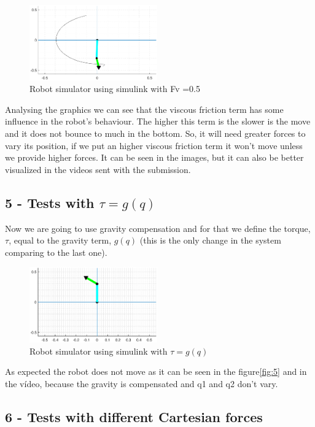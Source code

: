 \begin{figure}[H]
    \centering
    \includegraphics[width=0.49\textwidth]{imgs/4.4.eps}
    \caption{Robot simulator using simulink with Fv =0.5}
    \label{fig:4.5}
\end{figure}

Analysing the graphics we can see that the viscous friction term has some influence in the robot's behaviour. The higher this term is the slower is the move and it does not bounce to much in the bottom. So, it will need greater forces to vary its position, if we put an higher viscous friction term it won't move unless we provide higher forces. It can be seen in the images, but it can also be better visualized in the videos sent with the submission.

\subsection{5 - Tests with $\tau = g(q)$}

Now we are going to use gravity compensation and for that we define the torque, $\tau$, equal to the gravity term, $g(q)$ (this is the only change in the system comparing to the last one).

\begin{figure}[H]
    \centering
    \includegraphics[width=0.49\textwidth]{imgs/5.1.eps}
    \caption{Robot simulator using simulink with $\tau = g(q)$}
    \label{fig:5}
\end{figure}

As expected the robot does not move as it can be seen in the  figure\eqref{fig:5} and in the vídeo, because the gravity is compensated and q1 and q2 don't vary.

\subsection{6 - Tests with different Cartesian forces}

